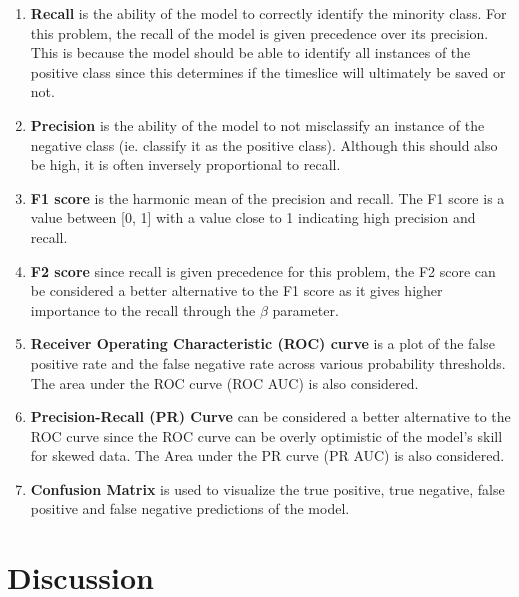 \begin{enumerate}
\item \textbf{Recall} is the ability of the model to correctly
  identify the minority class. For this problem, the recall of the
  model is given precedence over its precision. This is because the
  model should be able to identify all instances of the positive class
  since this determines if the timeslice will ultimately be saved or
  not.
\item \textbf{Precision} is the ability of the model to not
  misclassify an instance of the negative class (ie. classify it as
  the positive class). Although this should also be high, it is often
  inversely proportional to recall.
\item \textbf{F1 score} is the harmonic mean of the precision and
  recall. The F1 score is a value between [0, 1] with a value close to
  1 indicating high precision and recall.
\item \textbf{F2 score} since recall is given precedence for this
  problem, the F2 score can be considered a better alternative to the
  F1 score as it gives higher importance to the recall through the
  $\beta$ parameter.
\item \textbf{Receiver Operating Characteristic (ROC) curve} is a plot
  of the false positive rate and the false negative rate across
  various probability thresholds. The area under the ROC curve (ROC
  AUC) is also considered.
\item \textbf{Precision-Recall (PR) Curve} can be considered a better
  alternative to the ROC curve since the ROC curve can be overly
  optimistic of the model's skill for skewed data. The Area under the
  PR curve (PR AUC) is also considered.
\item \textbf{Confusion Matrix} is used to visualize the true
  positive, true negative, false positive and false negative
  predictions of the model.
\end{enumerate}

\section{Discussion}

